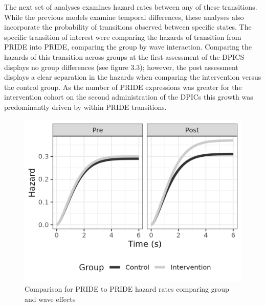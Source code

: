 \documentclass[12pt]{./styles/outhesis}
\begin{document}
The next set of analyses examines hazard rates between any of these
transitions. While the previous models examine temporal differences,
these analyses also incorporate the probability of transitions observed
between specific states. The specific transition of interest were
comparing the hazards of transition from PRIDE into PRIDE, comparing the
group by wave interaction. Comparing the hazards of this transition
across groups at the first assessment of the DPICS displays no group
differences (see figure 3.3); however, the post assessment displays a
clear separation in the hazards when comparing the intervention versus
the control group. As the number of PRIDE expressions was greater for
the intervention cohort on the second administration of the DPICs this
growth was predominantly driven by within PRIDE transitions.

\begin{figure}
\centering
\includegraphics[width=12cm]{figures/allTransOnetoOne.png}
\caption{Comparison for PRIDE to PRIDE hazard rates comparing group and
wave effects}
\end{figure}
\end{document}
